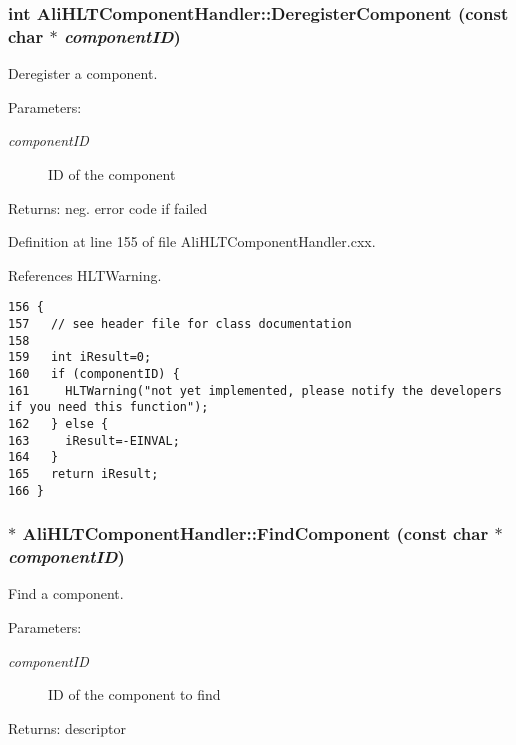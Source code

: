 \subsubsection{\setlength{\rightskip}{0pt plus 5cm}int Ali\-HLTComponent\-Handler::Deregister\-Component (const char $\ast$ {\em component\-ID})}\label{classAliHLTComponentHandler_a12}


Deregister a component. \begin{Desc}
\item[Parameters:]
\begin{description}
\item[{\em component\-ID}]ID of the component \end{description}
\end{Desc}
\begin{Desc}
\item[Returns:]neg. error code if failed \end{Desc}


Definition at line 155 of file Ali\-HLTComponent\-Handler.cxx.

References HLTWarning.

\footnotesize\begin{verbatim}156 {
157   // see header file for class documentation
158 
159   int iResult=0;
160   if (componentID) {
161     HLTWarning("not yet implemented, please notify the developers if you need this function");
162   } else {
163     iResult=-EINVAL;
164   }
165   return iResult;
166 }
\end{verbatim}\normalsize 


\subsubsection{ $\ast$ Ali\-HLTComponent\-Handler::Find\-Component (const char $\ast$ {\em component\-ID})\hspace{0.3cm}{\tt  [private]}}\label{classAliHLTComponentHandler_d1}


Find a component. \begin{Desc}
\item[Parameters:]
\begin{description}
\item[{\em component\-ID}]ID of the component to find \end{description}
\end{Desc}
\begin{Desc}
\item[Returns:]descriptor \end{Desc}


